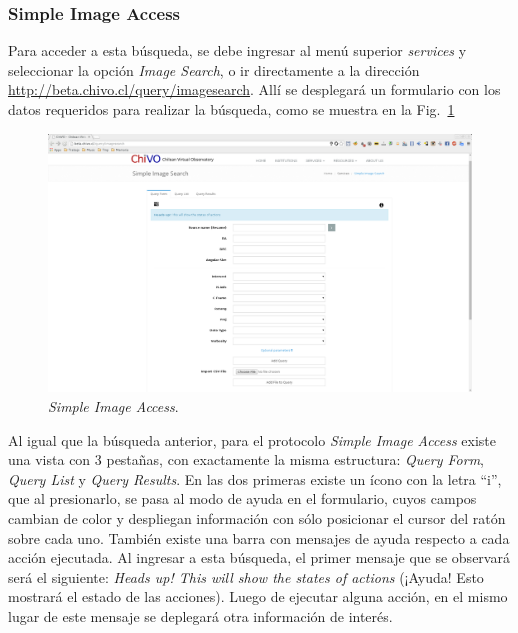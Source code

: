 \subsubsection{Simple Image Access}

Para acceder a esta búsqueda, se debe ingresar al menú superior
\emph{services} y seleccionar la opción \emph{Image Search}, o ir
directamente a la dirección
\url{http://beta.chivo.cl/query/imagesearch}. Allí se desplegará un
formulario con los datos requeridos para realizar la búsqueda, como se
muestra en la Fig.~\ref{img:sia}

\begin{figure}[ht!]
    \begin{center}
	\includegraphics[scale=.2]{img/sia}
    \end{center}
    \caption{\emph{Simple Image Access}.}\label{img:sia}
\end{figure}

Al igual que la búsqueda anterior, para el protocolo \emph{Simple
Image Access} existe una vista con 3 pestañas, con exactamente la
misma estructura: \emph{Query Form}, \emph{Query List} y \emph{Query
Results}. En las dos primeras existe un ícono con la letra ``i'', que
al presionarlo, se pasa al modo de ayuda en el formulario, cuyos
campos cambian de color y despliegan información con sólo posicionar
el cursor del ratón sobre cada uno. También existe una barra con
mensajes de ayuda respecto a cada acción ejecutada. Al ingresar a esta
búsqueda, el primer mensaje que se observará será el siguiente:
\emph{Heads up! This will show the states of actions} (¡Ayuda! Esto
mostrará el estado de las acciones). Luego de ejecutar alguna acción,
en el mismo lugar de este mensaje se deplegará otra información de
interés.

